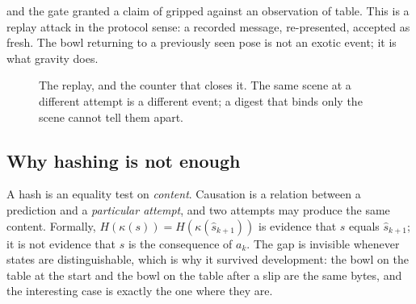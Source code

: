 \documentclass[conference]{IEEEtran}
\theoremstyle{definition}
\begin{document}
\noindent and the gate granted a claim of \textsf{gripped} against an
observation of \textsf{table}. This is a replay attack in the protocol sense:
a recorded message, re-presented, accepted as fresh. The bowl returning to a
previously seen pose is not an exotic event; it is what gravity does.

\begin{figure}[!htbp]
\centering
{}
\caption{The replay, and the counter that closes it. The same scene at a
different attempt is a different event; a digest that binds only the scene
cannot tell them apart.}
\label{fig:replay}
\end{figure}

\subsection{Why hashing is not enough}

A hash is an equality test on \emph{content}. Causation is a relation between a
prediction and a \emph{particular attempt}, and two attempts may produce the same
content. Formally, $H(\kappa(s)) = H(\kappa(\hat{s}_{k+1}))$ is evidence that
$s$ equals $\hat{s}_{k+1}$; it is not evidence that $s$ is the consequence of
$a_k$. The gap is invisible whenever states are distinguishable, which is why it
survived development: the bowl on the table at the start and the bowl on the
table after a slip are the same bytes, and the interesting case is exactly the
one where they are.
\end{document}
